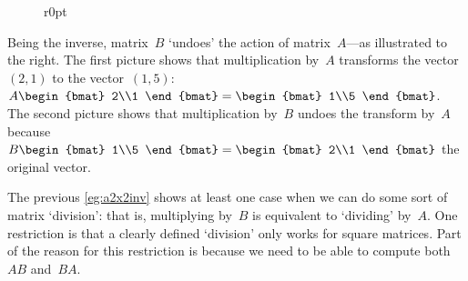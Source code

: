 \begin{example}
\begin{solution}
\begin{wrapfigure}r{0pt}
\end{wrapfigure}
Being the inverse, matrix~\(B\) `undoes' the action of matrix~\(A\)---as illustrated to the right.
The first picture shows that multiplication by~\(A\) transforms the vector~\((2,1)\) to the vector~\((1,5)\): \(A\begin{bmat} 2\\1 \end{bmat}=\begin{bmat} 1\\5 \end{bmat}\).
The second picture shows that multiplication by~\(B\) undoes the transform by~\(A\) because \(B\begin{bmat} 1\\5 \end{bmat}=\begin{bmat} 2\\1 \end{bmat}\) the original vector.
\aqed

\end{solution}
\end{example}

The previous \cref{eg:a2x2inv} shows at least one case when we can do some sort of matrix `division': that is, multiplying by~\(B\) is equivalent to `dividing' by~\(A\).
One restriction is that a clearly defined `division' only works for square matrices.
Part of the reason for this restriction is because we need to be able to compute both~\(AB\) and~\(BA\).


